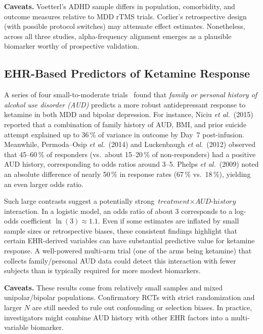 \documentclass[11pt]{article}
\begin{document}
\vspace{1ex}
\noindent
\textbf{Caveats.} 
Voetterl's ADHD sample differs in population, comorbidity, and outcome measures relative to MDD rTMS trials. Corlier's retrospective design (with possible protocol switches) may attenuate effect estimates. Nonetheless, across all three studies, alpha-frequency alignment emerges as a plausible biomarker worthy of prospective validation.

\subsection{EHR-Based Predictors of Ketamine Response}

A series of four small-to-moderate trials~\cite{niciu2014,permoda-osip2014,luckenbaugh2012,phelps2009} found that \emph{family or personal history of alcohol use disorder (AUD)} predicts a more robust antidepressant response to ketamine in both MDD and bipolar depression. For instance, Niciu \textit{et al.}~(2015) reported that a combination of family history of AUD, BMI, and prior suicide attempt explained up to 36\,\% of variance in outcome by Day~7 post-infusion. Meanwhile, Permoda--Osip \textit{et al.}~(2014) and Luckenbaugh \textit{et al.}~(2012) observed that 45--60\,\% of responders (vs.\ about 15--20\,\% of non-responders) had a positive AUD history, corresponding to odds ratios around 3--5. Phelps \textit{et al.}~(2009) noted an absolute difference of nearly 50\,\% in response rates (67\,\% vs.\ 18\,\%), yielding an even larger odds ratio.

Such large contrasts suggest a potentially strong $\textit{treatment} \times \textit{AUD-history}$ interaction. In a logistic model, an odds ratio of about 3 corresponds to a log-odds coefficient $\ln(3)\approx 1.1$. Even if some estimates are inflated by small sample sizes or retrospective biases, these consistent findings highlight that certain EHR-derived variables can have substantial predictive value for ketamine response. A well-powered multi-arm trial (one of the arms being ketamine) that collects family/personal AUD data could detect this interaction with fewer subjects than is typically required for more modest biomarkers.

\vspace{1ex}
\noindent
\textbf{Caveats.} 
These results come from relatively small samples and mixed unipolar/bipolar populations. Confirmatory RCTs with strict randomization and larger $N$ are still needed to rule out confounding or selection biases. In practice, investigators might combine AUD history with other EHR factors into a multi-variable biomarker.
\end{document}
